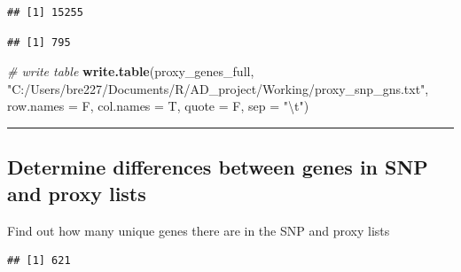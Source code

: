 \documentclass[]{article}
\newenvironment{Shaded}{\begin{snugshade}}{\end{snugshade}}
\newcommand{\KeywordTok}[1]{\textcolor[rgb]{0.13,0.29,0.53}{\textbf{#1}}}
\newcommand{\DataTypeTok}[1]{\textcolor[rgb]{0.13,0.29,0.53}{#1}}
\newcommand{\CharTok}[1]{\textcolor[rgb]{0.31,0.60,0.02}{#1}}
\newcommand{\StringTok}[1]{\textcolor[rgb]{0.31,0.60,0.02}{#1}}
\newcommand{\CommentTok}[1]{\textcolor[rgb]{0.56,0.35,0.01}{\textit{#1}}}
\newcommand{\OperatorTok}[1]{\textcolor[rgb]{0.81,0.36,0.00}{\textbf{#1}}}
\newcommand{\NormalTok}[1]{#1}
\begin{document}
\begin{verbatim}
## [1] 15255
\end{verbatim}

\begin{Shaded}
\end{Shaded}

\begin{verbatim}
## [1] 795
\end{verbatim}

\begin{Shaded}
\begin{Highlighting}[]
\CommentTok{# write table}
\KeywordTok{write.table}\NormalTok{(proxy_genes_full, }\StringTok{"C:/Users/bre227/Documents/R/AD_project/Working/proxy_snp_gns.txt"}\NormalTok{, }\DataTypeTok{row.names =}\NormalTok{ F, }\DataTypeTok{col.names =}\NormalTok{ T, }\DataTypeTok{quote =}\NormalTok{ F, }\DataTypeTok{sep =} \StringTok{"}\CharTok{\textbackslash{}t}\StringTok{"}\NormalTok{)}
\end{Highlighting}
\end{Shaded}

\begin{center}\rule{0.5\linewidth}{\linethickness}\end{center}

\subsection{Determine differences between genes in SNP and proxy
lists}\label{determine-differences-between-genes-in-snp-and-proxy-lists}

Find out how many unique genes there are in the SNP and proxy lists

\begin{Shaded}
\end{Shaded}

\begin{verbatim}
## [1] 621
\end{verbatim}

\begin{Shaded}
\end{Shaded}
\end{document}
